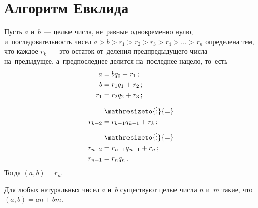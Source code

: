 
\section*{Алгоритм Евклида}


Пусть $a$ и~$b$~--- целые числа, не~равные одновременно нулю,
и~последовательность чисел
$a > b > r_{1} > r_{2} > r_{3} > r_{4} > \ldots > r_{n}$
определена тем, что каждое $r_k$~--- это остаток от~деления предпредыдущего
числа на~предыдущее, а~предпоследнее делится на~последнее нацело, то~есть
\begin{align*}
    a &= b q_0 + r_1
\, ; \\
    b &= r_1 q_1 + r_2
\, ; \\
    r_{1} &= r_2q_2 + r_3
\, ; \\ & \mathrel{\mathresizeto{\vdots}{=}} \\
    r_{k-2} &= r_{k-1} q_{k-1} + r_{k}
\, ; \\ & \mathrel{\mathresizeto{\vdots}{=}} \\
    r_{n-2} &= r_{n-1} q_{n-1} + r_n
\, ; \\
    r_{n-1} &= r_{n} q_{n}
\, . \end{align*}
Тогда $(a, b) = r_{n}$.

Для любых натуральных чисел $a$ и~$b$ существуют целые числа $n$ и~$m$ такие,
что $(a, b) = a n + b m$.

